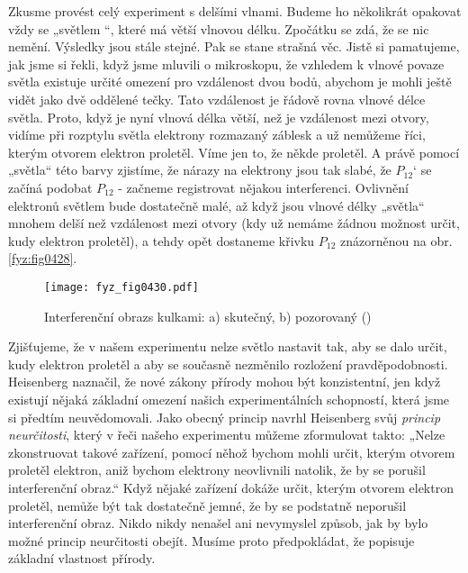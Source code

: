     Zkusme provést celý experiment s delšími vlnami. Budeme ho několikrát opakovat vždy se „světlem
    “, které má větší vlnovou délku. Zpočátku se zdá, že se nic nemění. Výsledky jsou stále stejné.
    Pak se stane strašná věc. Jistě si pamatujeme, jak jsme si řekli, když jsme mluvili o
    mikroskopu, že vzhledem k vlnové povaze světla existuje určité omezení pro vzdálenost dvou bodů,
    abychom je mohli ještě vidět jako dvě oddělené tečky. Tato vzdálenost je řádově rovna vlnové
    délce světla. Proto, když je nyní vlnová délka větší, než je vzdálenost mezi otvory, vidíme při
    rozptylu světla elektrony rozmazaný záblesk a už nemůžeme říci, kterým otvorem elektron
    proletěl. Víme jen to, že někde proletěl. A právě pomocí „světla“ této barvy zjistíme, že nárazy
    na elektrony jsou tak slabé, že \(P_{12}‘\) se začíná podobat \(P_{12}\) - začneme registrovat
    nějakou interferenci. Ovlivnění elektronů světlem bude dostatečně malé, až když jsou vlnové
    délky „světla“ mnohem delší než vzdálenost mezi otvory (kdy už nemáme žádnou možnost určit, kudy
    elektron proletěl), a tehdy opět dostaneme křivku \(P_{12}\) znázorněnou na obr.
    \ref{fyz:fig0428}.

    \begin{figure}[ht!] %
      \centering
      \texttt{[image: fyz\_fig0430.pdf]}
      \caption{Interferenční obrazs kulkami: a) skutečný, b) pozorovaný (\cite[s.~697]{Feynman01})}
      \label{fyz:fig0430}
    \end{figure}

    Zjišťujeme, že v našem experimentu nelze světlo nastavit tak, aby se dalo určit, kudy elektron
    proletěl a aby se současně nezměnilo rozložení pravděpodobnosti. Heisenberg naznačil, že nové
    zákony přírody mohou být konzistentní, jen když existují nějaká základní omezení našich
    experimentálních schopností, která jsme si předtím neuvědomovali. Jako obecný princip navrhl
    Heisenberg svůj \emph{princip neurčitosti}, který v řeči našeho experimentu můžeme zformulovat
    takto: „Nelze zkonstruovat takové zařízení, pomocí něhož bychom mohli určit, kterým otvorem
    proletěl elektron, aniž bychom elektrony neovlivnili natolik, že by se porušil interferenční
    obraz.“ Když nějaké zařízení dokáže určit, kterým otvorem elektron proletěl, nemůže být tak
    dostatečně jemné, že by se podstatně neporušil interferenční obraz. Nikdo nikdy nenašel ani
    nevymyslel způsob, jak by bylo možné princip neurčitosti obejít. Musíme proto předpokládat, že
    popisuje základní vlastnost přírody.
    
